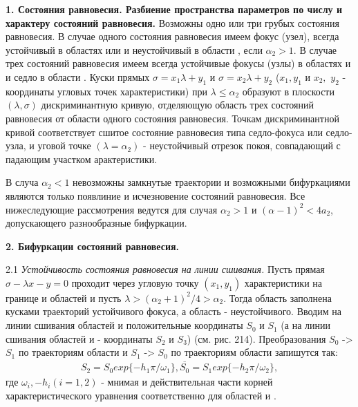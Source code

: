 \documentclass{article}
\newcommand{\RomanNumeralCaps}[1]
    {\MakeUppercase{\romannumeral #1}}
\begin{document}
\textbf{1. Состояния равновесия. Разбиение пространства параметров
по числу и характеру состояний равновесия.} Возможны одно
или три грубых состояния равновесия. В случае одного состояния
равновесия имеем фокус (узел), всегда устойчивый в областях
\RomanNumeralCaps{1} или \RomanNumeralCaps{3} и неустойчивый в области \RomanNumeralCaps{2}, если $\alpha_{2}>1$. В случае
трех состояний равновесия имеем
всегда устойчивые фокусы (узлы)
в областях \RomanNumeralCaps{1} и \RomanNumeralCaps{3} и седло в области
\RomanNumeralCaps{2}. Куски прямых $\sigma = x_{1} \lambda +y_{1}$
и $\sigma = x_{2} \lambda +y_{2}$ ($x_{1}, y_{1}$ и $x_{2},$
$y_{2}$ - координаты угловых точек
характеристики) при $\lambda \leq \alpha_{2} $ образуют
в плоскости $(\lambda, \sigma)$ дискриминантную 
кривую, отделяющую область
трех состояний равновесия
от области одного состояния равновесия. Точкам дискриминантной
кривой соответствует сшитое состояние
равновесия типа седло-фокуса или седло-узла, и уговой 
точке $(\lambda = \alpha_{2})$ - неустойчивый отрезок покоя, совпадающий с падающим
участком арактеристики.

В случа $\alpha_{2}<1$ невозможны замкнутые траектории и возможными
бифуркациями являются только появлиние и исчезновение
состояний равновесия. Все нижеследующие рассмотрения ведутся
для случая $\alpha_{2}>1$ и $(\alpha - 1)^2<4a_{2}$, допускающего разнообразные
бифуркации.

\textbf{2. Бифуркации состояний равновесия.}

2.1 \textit{Устойчивость состояния равновесия на линии сшивания.}
Пусть прямая $\sigma - \lambda x - y = 0$ проходит через угловую точку
$(x_{1}, y_{1})$ характеристики на границе \RomanNumeralCaps{1} и \RomanNumeralCaps{2} областей и пусть
$\lambda > (\alpha_{2} + 1)^2/4>\alpha_{2}$. Тогда область \RomanNumeralCaps{1} заполнена кусками траекторий 
устойчивого фокуса, а область \RomanNumeralCaps{2} - неустойчивого. Вводим на 
линии сшивания областей \RomanNumeralCaps{1} и \RomanNumeralCaps{2} положительные координаты $S_{0}$ 
и $S_{1}$ (а на линии сшивания областей \RomanNumeralCaps{2} и \RomanNumeralCaps{3} - координаты $S_{2}$ и 
$S_{3}$) (см. рис. 214). Преобразования $S_{0}$ -> $S_{1}$ по траекториям области
\RomanNumeralCaps{1} и $S_{1}$ -> $S_{0}$ по траекториям области \RomanNumeralCaps{2} запишутся так:
\begin{gather}
S_{2}=S_{0}exp\{-h_{1}\pi/ \omega_{1}\}, \overline{S_{0}}=S_{1}exp\{-h_{2}\pi/ \omega_{2}\},
\end{gather}
где $\omega_{i}, -h_{i} (i=1, 2)$ - мнимая и действительная части корней
характеристического уравнения соответственно для областей
\RomanNumeralCaps{1} и \RomanNumeralCaps{2}.
\end{document}
